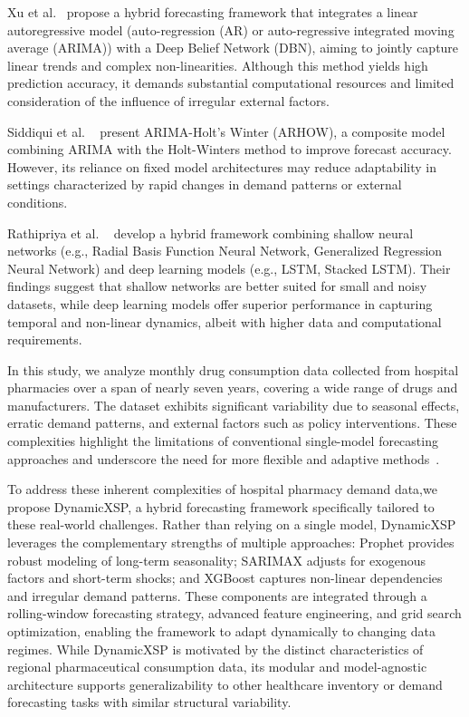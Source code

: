 \documentclass[12pt]{article}
\begin{document}
Xu et al.~\cite{xu2019hybrid} propose a hybrid forecasting framework that integrates a linear autoregressive model (auto-regression (AR) or auto-regressive integrated moving average (ARIMA)) with a Deep Belief Network (DBN), aiming to jointly capture linear trends and complex non-linearities. Although this method yields high prediction accuracy, it demands substantial computational resources and limited consideration of the influence of irregular external factors. 

Siddiqui et al. ~\cite{siddiqui2021hybrid} present ARIMA-Holt’s Winter (ARHOW), a composite model combining ARIMA with the Holt-Winters method to improve forecast accuracy. However, its reliance on fixed model architectures may reduce adaptability in settings characterized by rapid changes in demand patterns or external conditions.

Rathipriya et al. ~\cite{rathipriya2022pharma} develop a hybrid framework combining shallow neural networks (e.g., Radial Basis Function Neural Network, Generalized Regression Neural Network) and deep learning models (e.g., LSTM, Stacked LSTM). Their findings suggest that shallow networks are better suited for small and noisy datasets, while deep learning models offer superior performance in capturing temporal and non-linear dynamics, albeit with higher data and computational requirements.

In this study, we analyze monthly drug consumption data collected from hospital pharmacies over a span of nearly seven years, covering a wide range of drugs and manufacturers. The dataset exhibits significant variability due to seasonal effects, erratic demand patterns, and external factors such as policy interventions. These complexities highlight the limitations of conventional single-model forecasting approaches and underscore the need for more flexible and adaptive methods~\cite{lee2019}. 

To address these inherent complexities of hospital pharmacy demand data,we propose DynamicXSP, a hybrid forecasting framework specifically tailored to these real-world challenges. Rather than relying on a single model, DynamicXSP leverages the complementary strengths of multiple approaches: Prophet provides robust modeling of long-term seasonality; SARIMAX adjusts for exogenous factors and short-term shocks; and XGBoost captures non-linear dependencies and irregular demand patterns. These components are integrated through a rolling-window forecasting strategy, advanced feature engineering, and grid search optimization, enabling the framework to adapt dynamically to changing data regimes. While DynamicXSP is motivated by the distinct characteristics of regional pharmaceutical consumption data, its modular and model-agnostic architecture supports generalizability to other healthcare inventory or demand forecasting tasks with similar structural variability.
\end{document}
